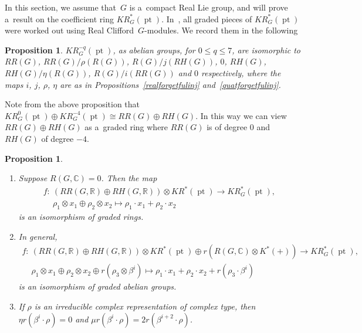\documentclass[11pt]{article}
\numberwithin{equation}{section}
\newtheorem{Proposition}[Theorem]{Proposition}
{\theoremstyle{definition}
\newtheorem{Definition}[Theorem]{Definition}
\newtheorem{Example}[Theorem]{Example}
\newtheorem{Remark}[Theorem]{Remark}
}
\DeclareMathOperator{\pt}{pt}
\begin{document}
In this section, we assume that~$G$ is a~compact Real Lie group, and will prove a~result on the coef\/f\/icient ring
$KR_G^*(\pt)$.
In~\cite{AS}, all graded pieces of $KR_G^*(\pt)$ were worked out using Real Clif\/ford~$G$-modules.
We record them in the following
\begin{Proposition}
\label{ASKRcomp}
$KR^{-q}_G(\pt)$, as abelian groups, for $0\leq q\leq 7$, are isomorphic to $RR(G)$, $RR(G)/\rho(R(G))$,
$R(G)/j(RH(G))$, $0$, $RH(G)$, $RH(G)/\eta(R(G))$, $R(G)/i(RR(G))$ and $0$ respectively, where the maps $i$, $j$, $\rho$, $\eta$
are as in Propositions~{\rm \ref{realforgetfulinj}} and~{\rm \ref{quatforgetfulinj}}.
\end{Proposition}
\begin{Remark}
Note from the above proposition
that $KR_G^0(\pt)\oplus KR^{-4}_G(\pt)\cong RR(G)\oplus RH(G)$.
In this way we can view $RR(G)\oplus RH(G)$ as a~graded ring where $RR(G)$ is of degree 0 and $RH(G)$ of degree $-4$.
\end{Remark}
\begin{Proposition}\label{KR_G}\quad
\begin{enumerate}\itemsep=0pt
\item[$1.$]
Suppose $R(G, \mathbb{C})=0$.
Then the map
\begin{gather*}
f:  \ (RR(G, \mathbb{R})\oplus RH(G, \mathbb{R}))\otimes KR^*(\pt)  \to  KR^*_G(\pt),
\\
\phantom{f: {}} \
\rho_1\otimes x_1\oplus \rho_2\otimes x_2  \mapsto  \rho_1\cdot x_1+\rho_2\cdot x_2
\end{gather*}
is an isomorphism of graded rings.
\item[$2.$]
In general,
\begin{gather*}
f: \ (RR(G, \mathbb{R})\oplus RH(G, \mathbb{R}))\otimes KR^*(\pt)\oplus r(R(G, \mathbb{C})\otimes K^*(+))\to
KR^*_G(\pt),
\\
\phantom{f: {}} \
\rho_1\otimes x_1\oplus \rho_2\otimes x_2\oplus r(\rho_3\otimes \beta^i)\mapsto \rho_1\cdot x_1+\rho_2\cdot
x_2+r(\rho_3\cdot\beta^i)
\end{gather*}
is an isomorphism of graded abelian groups.
\item[$3.$]
If $\rho$ is an irreducible complex representation of complex type, then $\eta r(\beta^i\cdot\rho)=0$ and $\mu
r(\beta^i\cdot\rho)=2r(\beta^{i+2}\cdot\rho)$.
\end{enumerate}
\end{Proposition}
\end{document}
